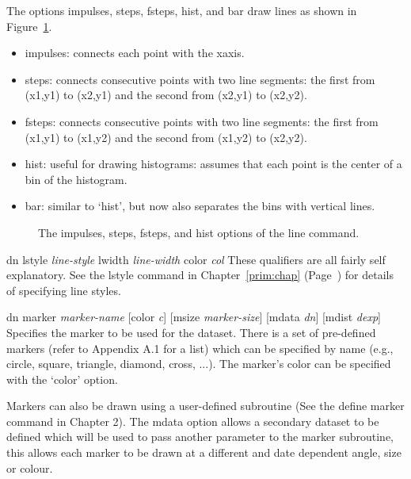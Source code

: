 \begin{commanddescription}
The options {\sf impulses}, {\sf steps}, {\sf fsteps}, {\sf hist}, and {\sf bar} draw lines as shown in Figure~\ref{linemode:fig}.
\begin{itemize}
\item {\sf impulses}: connects each point with the xaxis.

\item {\sf steps}: connects consecutive points with two line segments: the first from (x1,y1) to (x2,y1) and the second from (x2,y1) to (x2,y2).

\item {\sf fsteps}: connects consecutive points with two line segments: the first from (x1,y1) to (x1,y2) and the second from (x1,y2) to (x2,y2).

\item {\sf hist}: useful for drawing histograms: assumes that each point is the center of a bin of the histogram.

\item {\sf bar}: similar to `{\sf hist}', but now also separates the bins with vertical lines.
\end{itemize}

\begin{figure}[tb]
\centering

\caption{\label{linemode:fig}The {\sf impulses}, {\sf steps}, {\sf fsteps}, and {\sf hist} options of the line command.}
\end{figure}

\item[{\sf dn lstyle {\it line-style} lwidth {\it line-width} color {\it col}}  ]
These qualifiers are all fairly self explanatory.  See the {\sf lstyle} command
in Chapter~\ref{prim:chap} (Page~\pageref{lstyle:cmd}) for details of specifying line styles.

\item[{\sf dn marker {\it marker-name} [color {\it c}] [msize {\it marker-size}] [mdata {\it dn}] [mdist {\it dexp}]}]
Specifies the marker to be used for the dataset.  There is a set of pre-defined markers (refer to Appendix A.1 for a list)  which can be specified by name (e.g., {\sf circle, square, triangle, diamond, cross, ...}). The marker's color can be specified with the `{\sf color}' option.

Markers can also be drawn using a user-defined subroutine (See the {\sf define marker} command in Chapter 2).  The {\sf mdata} option allows a secondary dataset to be defined which will be used to pass another parameter to the marker subroutine, this allows each marker to be drawn at a different and date dependent angle, size or colour.


\end{commanddescription}
